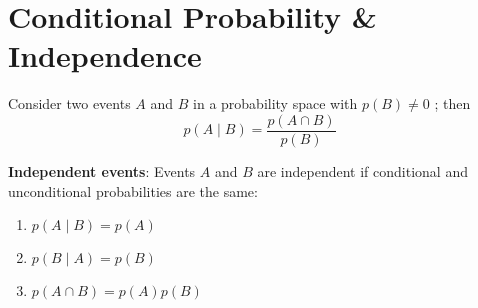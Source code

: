 \section{Conditional Probability \& Independence}

\begin{definition}
    Consider two events \(A\) and \(B\) in a probability space with
    \(p(B)\neq 0\) ; then
    \[
        p \left(A \mid B\right) = \frac {p (A \cap B)}{p (B)}
    \]
\end{definition}

\textbf{Independent events}: Events \(A\) and \(B\) are independent if conditional and unconditional probabilities are the same:
\begin{enumerate}
    \item \(p(A \mid B) = p(A)\)
    \item \(p(B \mid A) = p(B)\)
    \item \(p(A \cap B) = p(A)p(B)\)
\end{enumerate}

